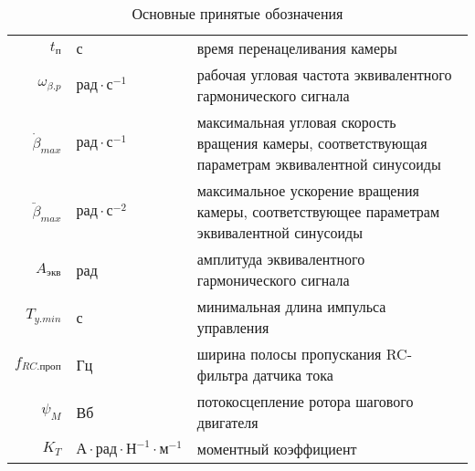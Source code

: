 \begin{table}[ht!]
\begin{tabular}{rll}
    $t_\text{п}$        & с & время перенацеливания камеры \\
    
    $\omega_{\beta.p}$  & $ \text{рад} \cdot \text{с}^{-1} $ & рабочая угловая
                            частота эквивалентного гармонического сигнала \\
    
    $\dot{\beta}_{max}$ & $\text{рад} \cdot \text{с}^{-1}$ & максимальная угловая
                            скорость вращения камеры, соответствующая параметрам эквивалентной синусоиды \\
    
    $\ddot{\beta}_{max}$ & $ \text{рад} \cdot \text{с}^{-2} $ & максимальное ускорение
                            вращения камеры, соответствующее параметрам эквивалентной синусоиды \\
    
    $A_{\text{экв}}$     & рад & амплитуда эквивалентного гармонического сигнала \\
    
    $T_{y.min}$          & с & минимальная длина импульса управления \\
    
    $f_{RC.\text{проп}}$ & Гц & ширина полосы пропускания RC-фильтра датчика тока \\
    
    $\psi_{M}$           & Вб & потокосцепление ротора шагового двигателя \\
    $K_{T}$              & $\text{А} \cdot \text{рад} \cdot \text{Н}^{-1} \cdot \text{м}^{-1}$ & моментный коэффициент \\

    \end{tabular}
    \caption{ Основные принятые обозначения }
\end{table}

